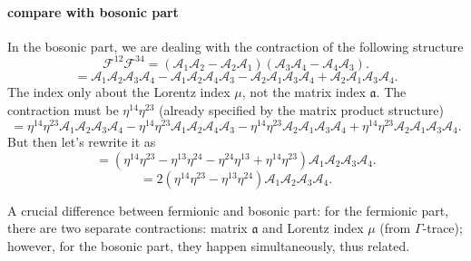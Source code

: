 \paragraph{compare with bosonic part}
In the bosonic part, we are dealing with the contraction of the following structure
\[
	\mathcal{F}^{12} \mathcal{F}^{34}
	= (\mathcal{A}_1 \mathcal{A}_2 - \mathcal{A}_2 \mathcal{A}_1)
	(\mathcal{A}_3 \mathcal{A}_4 - \mathcal{A}_4 \mathcal{A}_3)
.\] 
\[
=\mathcal{A}_1 \mathcal{A}_2 \mathcal{A}_3 \mathcal{A}_4
- \mathcal{A}_1 \mathcal{A}_2 \mathcal{A}_4 \mathcal{A}_3
- \mathcal{A}_2 \mathcal{A}_1 \mathcal{A}_3 \mathcal{A}_4
+ \mathcal{A}_2 \mathcal{A}_1 \mathcal{A}_3 \mathcal{A}_4
.\] 
The index only about the Lorentz index $\mu$, not the matrix index $\mathfrak{a}$.
The contraction must be $\eta^{14} \eta^{23}$
(already specified by the matrix product structure)
\[
	= \eta^{14} \eta^{23}\mathcal{A}_1 \mathcal{A}_2 \mathcal{A}_3 \mathcal{A}_4
-\eta^{14} \eta^{23} \mathcal{A}_1 \mathcal{A}_2 \mathcal{A}_4 \mathcal{A}_3
-\eta^{14} \eta^{23} \mathcal{A}_2 \mathcal{A}_1 \mathcal{A}_3 \mathcal{A}_4
+\eta^{14} \eta^{23} \mathcal{A}_2 \mathcal{A}_1 \mathcal{A}_3 \mathcal{A}_4
.\] 
But then let's rewrite it as
\[
	= (\eta^{14} \eta^{23} - \eta^{13} \eta^{24}
	- \eta^{24} \eta^{13} + \eta^{14} \eta^{23})
	\mathcal{A}_1 \mathcal{A}_2 \mathcal{A}_3 \mathcal{A}_4
.\] 
\[
	= 2(\eta^{14} \eta^{23} - \eta^{13} \eta^{24})
	\mathcal{A}_1 \mathcal{A}_2 \mathcal{A}_3 \mathcal{A}_4
.\] 

A crucial difference between fermionic and bosonic part:
for the fermionic part, there are two separate contractions:
matrix $\mathfrak{a}$ and Lorentz index $\mu$ (from $\Gamma$-trace);
however, for the bosonic part, they happen simultaneously, thus related.
